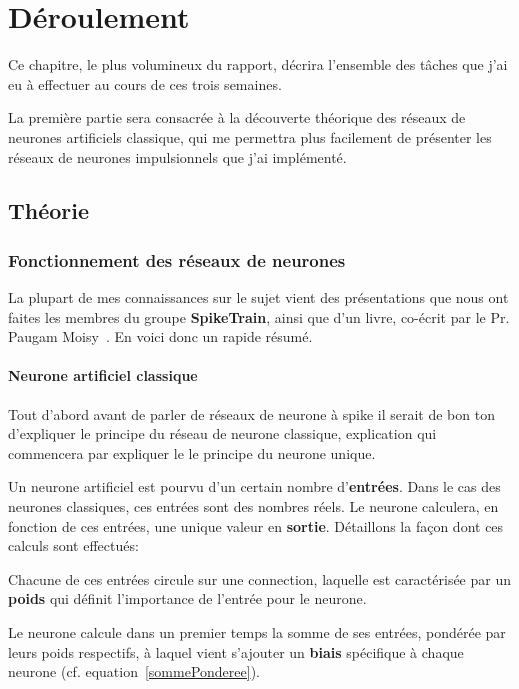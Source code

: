 \hypertarget{Déroulement}{%
\chapter{Déroulement}\label{Déroulement}}

Ce chapitre, le plus volumineux du rapport, décrira l'ensemble des tâches que j'ai eu à effectuer au cours de ces trois semaines.

La première partie sera consacrée à la découverte théorique des réseaux de neurones artificiels classique, qui me permettra plus facilement de présenter les réseaux de neurones impulsionnels que j'ai implémenté.

\section{Théorie}
\subsection{Fonctionnement des réseaux de neurones}
La plupart de mes connaissances sur le sujet vient des présentations que nous ont faites les membres du groupe \textbf{SpikeTrain}, ainsi que d'un livre, co-écrit par le Pr. Paugam Moisy~\cite{naturalHandbook}.
En voici donc un rapide résumé.

\subsubsection{Neurone artificiel classique}
\label{neuroneClassique}
Tout d'abord avant de parler de réseaux de neurone à spike il serait de bon ton d'expliquer le principe du réseau de neurone classique, explication qui commencera par expliquer le
le principe du neurone unique.

Un neurone artificiel est pourvu d'un certain nombre d'\textbf{entrées}. Dans le cas des neurones classiques, ces entrées sont des nombres réels. Le neurone calculera, en fonction de ces entrées, une unique valeur en \textbf{sortie}.
Détaillons la façon dont ces calculs sont effectués:

Chacune de ces entrées circule sur une connection, laquelle est caractérisée par un \textbf{poids} qui définit l'importance de l'entrée pour le neurone.

Le neurone calcule dans un premier temps la somme de ses entrées, pondérée par leurs poids respectifs, à laquel vient s'ajouter un \textbf{biais} spécifique à chaque neurone (cf. equation~\ref{sommePonderee}).

